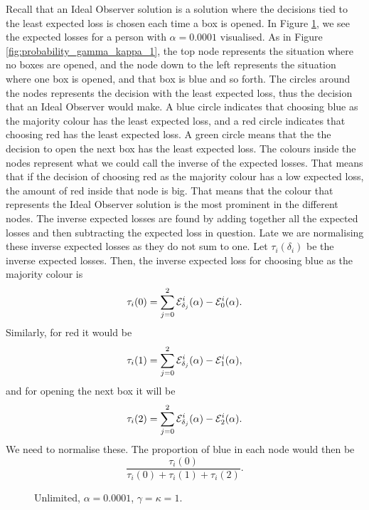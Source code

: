 Recall that an Ideal Observer solution is a solution where the decisions tied to the least expected loss is chosen each time a box is opened. In Figure \ref{fig:unlim_a0.0001_gk1}, we see the expected losses for a person with $\alpha=0.0001$ visualised. As in Figure \ref{fig:probability_gamma_kappa_1}, the top node represents the situation where no boxes are opened, and the node down to the left represents the situation where one box is opened, and that box is blue and so forth. The circles around the nodes represents the decision with the least expected loss, thus the decision that an Ideal Observer would make. A blue circle indicates that choosing blue as the majority colour has the least expected loss, and a red circle indicates that choosing red has the least expected loss. A green circle means that the the decision to open the next box has the least expected loss. The colours inside the nodes represent what we could call the inverse of the expected losses. That means that if the decision of choosing red as the majority colour has a low expected loss, the amount of red inside that node is big. That means that the colour that represents the Ideal Observer solution is the most prominent in the different nodes. The inverse expected losses are found by adding together all the expected losses and then subtracting the expected loss in question. Late we are normalising these inverse expected losses as they do not sum to one. Let $\tau_i(\delta_i)$ be the inverse expected losses. Then, the inverse expected loss for choosing blue as the majority colour is 
\begin{equation*}
    \tau_i(0) = \sum_{j=0}^2 \mathcal{E}_{\delta_j}^i(\alpha) - \mathcal{E}_0^i(\alpha).
\end{equation*}
Similarly, for red it would be
\begin{equation*}
    \tau_i(1) = \sum_{j=0}^2 \mathcal{E}_{\delta_j}^i(\alpha) - \mathcal{E}_1^i(\alpha),
\end{equation*}
and for opening the next box it will be
\begin{equation*}
    \tau_i(2) = \sum_{j=0}^2 \mathcal{E}_{\delta_j}^i(\alpha) - \mathcal{E}_2^i(\alpha).
\end{equation*}
We need to normalise these. The proportion of blue in each node would then be
\begin{equation*}
    \frac{\tau_i(0)}{\tau_i(0)+\tau_i(1)+\tau_i(2)}.
\end{equation*}
\begin{figure}
    \centering
    \scalebox{0.7}{}
    \caption[IO solution, unlimited. $\alpha=0.0001$, $\gamma=\kappa=1$]{Unlimited, $\alpha = 0.0001$, $\gamma=\kappa=1$.}
    \label{fig:unlim_a0.0001_gk1}
\end{figure}


